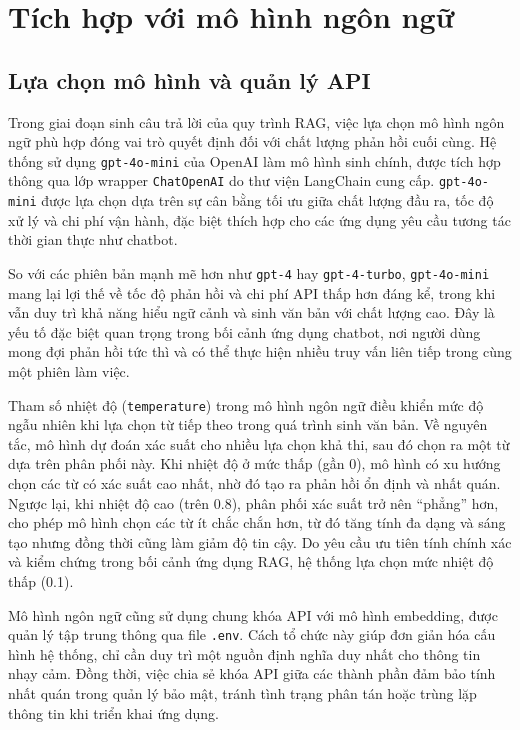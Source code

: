 \section{Tích hợp với mô hình ngôn ngữ}

\subsection{Lựa chọn mô hình và quản lý API}

Trong giai đoạn sinh câu trả lời của quy trình RAG, việc lựa chọn mô hình ngôn ngữ phù hợp đóng vai trò quyết định đối với chất lượng phản hồi cuối cùng. Hệ thống sử dụng \texttt{gpt-4o-mini} của OpenAI làm mô hình sinh chính, được tích hợp thông qua lớp wrapper \texttt{ChatOpenAI} do thư viện LangChain cung cấp. \texttt{gpt-4o-mini} được lựa chọn dựa trên sự cân bằng tối ưu giữa chất lượng đầu ra, tốc độ xử lý và chi phí vận hành, đặc biệt thích hợp cho các ứng dụng yêu cầu tương tác thời gian thực như chatbot.

So với các phiên bản mạnh mẽ hơn như \texttt{gpt-4} hay \texttt{gpt-4-turbo}, \texttt{gpt-4o-mini} mang lại lợi thế về tốc độ phản hồi và chi phí API thấp hơn đáng kể, trong khi vẫn duy trì khả năng hiểu ngữ cảnh và sinh văn bản với chất lượng cao. Đây là yếu tố đặc biệt quan trọng trong bối cảnh ứng dụng chatbot, nơi người dùng mong đợi phản hồi tức thì và có thể thực hiện nhiều truy vấn liên tiếp trong cùng một phiên làm việc.

Tham số nhiệt độ (\texttt{temperature}) trong mô hình ngôn ngữ điều khiển mức độ ngẫu nhiên khi lựa chọn từ tiếp theo trong quá trình sinh văn bản. Về nguyên tắc, mô hình dự đoán xác suất cho nhiều lựa chọn khả thi, sau đó chọn ra một từ dựa trên phân phối này. Khi nhiệt độ ở mức thấp (gần 0), mô hình có xu hướng chọn các từ có xác suất cao nhất, nhờ đó tạo ra phản hồi ổn định và nhất quán. Ngược lại, khi nhiệt độ cao (trên 0.8), phân phối xác suất trở nên ``phẳng'' hơn, cho phép mô hình chọn các từ ít chắc chắn hơn, từ đó tăng tính đa dạng và sáng tạo nhưng đồng thời cũng làm giảm độ tin cậy. Do yêu cầu ưu tiên tính chính xác và kiểm chứng trong bối cảnh ứng dụng RAG, hệ thống lựa chọn mức nhiệt độ thấp (0.1).

Mô hình ngôn ngữ cũng sử dụng chung khóa API với mô hình embedding, được quản lý tập trung thông qua file \texttt{.env}. Cách tổ chức này giúp đơn giản hóa cấu hình hệ thống, chỉ cần duy trì một nguồn định nghĩa duy nhất cho thông tin nhạy cảm. Đồng thời, việc chia sẻ khóa API giữa các thành phần đảm bảo tính nhất quán trong quản lý bảo mật, tránh tình trạng phân tán hoặc trùng lặp thông tin khi triển khai ứng dụng.

